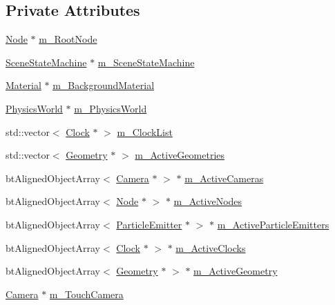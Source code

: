\subsection*{Private Attributes}
\begin{DoxyCompactItemize}
\item 
\mbox{\hyperlink{classnjli_1_1_node}{Node}} $\ast$ \mbox{\hyperlink{classnjli_1_1_scene_a43647a8e0be9fc885b5154c1af895afa}{m\+\_\+\+Root\+Node}}
\item 
\mbox{\hyperlink{classnjli_1_1_scene_state_machine}{Scene\+State\+Machine}} $\ast$ \mbox{\hyperlink{classnjli_1_1_scene_af74cab422e8f225410580c3094a621ab}{m\+\_\+\+Scene\+State\+Machine}}
\item 
\mbox{\hyperlink{classnjli_1_1_material}{Material}} $\ast$ \mbox{\hyperlink{classnjli_1_1_scene_ae68fc17490d0d3afc6aa5ac61cde8944}{m\+\_\+\+Background\+Material}}
\item 
\mbox{\hyperlink{classnjli_1_1_physics_world}{Physics\+World}} $\ast$ \mbox{\hyperlink{classnjli_1_1_scene_a987c6686913633182f6d4d71a917872a}{m\+\_\+\+Physics\+World}}
\item 
std\+::vector$<$ \mbox{\hyperlink{classnjli_1_1_clock}{Clock}} $\ast$ $>$ \mbox{\hyperlink{classnjli_1_1_scene_a43c89f420568172383a0a74dd4a4a2e0}{m\+\_\+\+Clock\+List}}
\item 
std\+::vector$<$ \mbox{\hyperlink{classnjli_1_1_geometry}{Geometry}} $\ast$ $>$ \mbox{\hyperlink{classnjli_1_1_scene_a35add44afe6bc1cffcfad5d4485598a7}{m\+\_\+\+Active\+Geometries}}
\item 
bt\+Aligned\+Object\+Array$<$ \mbox{\hyperlink{classnjli_1_1_camera}{Camera}} $\ast$ $>$ $\ast$ \mbox{\hyperlink{classnjli_1_1_scene_a848fbc8e44f9607cf718c3873733303c}{m\+\_\+\+Active\+Cameras}}
\item 
bt\+Aligned\+Object\+Array$<$ \mbox{\hyperlink{classnjli_1_1_node}{Node}} $\ast$ $>$ $\ast$ \mbox{\hyperlink{classnjli_1_1_scene_a24a8ee9f086038177024f3302ec4da55}{m\+\_\+\+Active\+Nodes}}
\item 
bt\+Aligned\+Object\+Array$<$ \mbox{\hyperlink{classnjli_1_1_particle_emitter}{Particle\+Emitter}} $\ast$ $>$ $\ast$ \mbox{\hyperlink{classnjli_1_1_scene_ae7fde2d5a6e6cff7000aa4c452c78fb9}{m\+\_\+\+Active\+Particle\+Emitters}}
\item 
bt\+Aligned\+Object\+Array$<$ \mbox{\hyperlink{classnjli_1_1_clock}{Clock}} $\ast$ $>$ $\ast$ \mbox{\hyperlink{classnjli_1_1_scene_a68d32e9cc141536aa783b34ba13ff82f}{m\+\_\+\+Active\+Clocks}}
\item 
bt\+Aligned\+Object\+Array$<$ \mbox{\hyperlink{classnjli_1_1_geometry}{Geometry}} $\ast$ $>$ $\ast$ \mbox{\hyperlink{classnjli_1_1_scene_a996289861e836e52dff177d6198b084b}{m\+\_\+\+Active\+Geometry}}
\item 
\mbox{\hyperlink{classnjli_1_1_camera}{Camera}} $\ast$ \mbox{\hyperlink{classnjli_1_1_scene_ad530ff8622354101eb23d43982a2fea9}{m\+\_\+\+Touch\+Camera}}
\end{DoxyCompactItemize}
